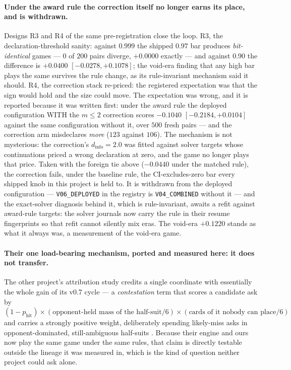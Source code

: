 \documentclass[11pt,a4paper]{article}
\begin{document}
\paragraph{Under the award rule the correction itself no longer earns its
place, and is withdrawn.} Designs R3 and R4 of the same pre-registration
close the loop. R3, the declaration-threshold sanity: against $0.999$ the
shipped $0.97$ bar produces \emph{bit-identical} games --- $0$ of $200$
pairs diverge, $+0.0000$ exactly --- and against $0.90$ the difference is
$+0.0400$ $[-0.0278, +0.1078]$; the void-era finding that any high bar
plays the same survives the rule change, as its rule-invariant mechanism
said it should. R4, the correction stack re-priced: the registered
expectation was that the sign would hold and the size could move. The
expectation was wrong, and it is reported because it was written first:
under the award rule the deployed configuration WITH the $m \le 2$
correction scores $-0.1040$ $[-0.2184, +0.0104]$ against the same
configuration without it, over $500$ fresh pairs --- and the correction arm
misdeclares \emph{more} ($123$ against $106$). The mechanism is not
mysterious: the correction's $d_{\text{info}} = 2.0$ was fitted against
solver targets whose continuations priced a wrong declaration at zero, and
the game no longer plays that price. Taken with the foreign tie above
($-0.0440$ under the matched rule), the correction fails, under the
baseline rule, the CI-excludes-zero bar every shipped knob in this project
is held to. It is withdrawn from the deployed configuration ---
\texttt{V06\_DEPLOYED} in the registry is \texttt{V04\_COMBINED} without it
--- and the exact-solver diagnosis behind it, which is rule-invariant,
awaits a refit against award-rule targets: the solver journals now carry
the rule in their resume fingerprints so that refit cannot silently mix
eras. The void-era $+0.1220$ stands as what it always was, a measurement
of the void-era game.

\paragraph{Their one load-bearing mechanism, ported and measured here: it
does not transfer.} The other project's attribution study credits a single
coordinate with essentially the whole gain of its v0.7 cycle --- a
\emph{contestation} term that scores a candidate ask by
$(1 - p_{\text{hit}}) \times (\text{opponent-held mass of the half-suit}/6)
\times (\text{cards of it nobody can place}/6)$ and carries a strongly
positive weight, deliberately spending likely-miss asks in
opponent-dominated, still-ambiguous half-suits
\citep{dylan2026fishbot}. Because their engine and ours now play the same
game under the same rules, that claim is directly testable outside the
lineage it was measured in, which is the kind of question neither project
could ask alone.
\end{document}

